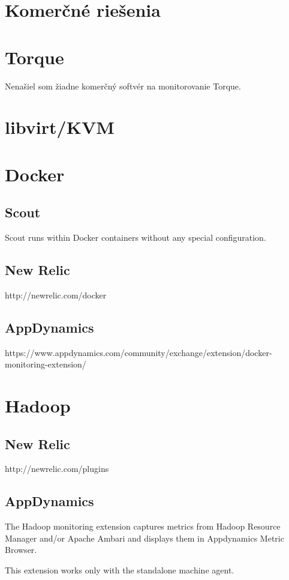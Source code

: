 \documentclass[11pt,final,oneside]{fithesis}
\begin{document}
\section{Komerčné riešenia}

\section{Torque}
Nenašiel som žiadne komerčný softvér na monitorovanie Torque. 

\section{libvirt/KVM}

\section{Docker}
\subsection{Scout}
Scout runs within Docker containers without any special configuration. \cite{scout}

\subsection{New Relic}
http://newrelic.com/docker

\subsection{AppDynamics}
https://www.appdynamics.com/community/exchange/extension/docker-monitoring-extension/


\section{Hadoop}
\subsection{New Relic}
http://newrelic.com/plugins

\subsection{AppDynamics}
The Hadoop monitoring extension captures metrics from Hadoop Resource Manager and/or Apache Ambari and displays them in Appdynamics Metric Browser.

This extension works only with the standalone machine agent.
\end{document}
